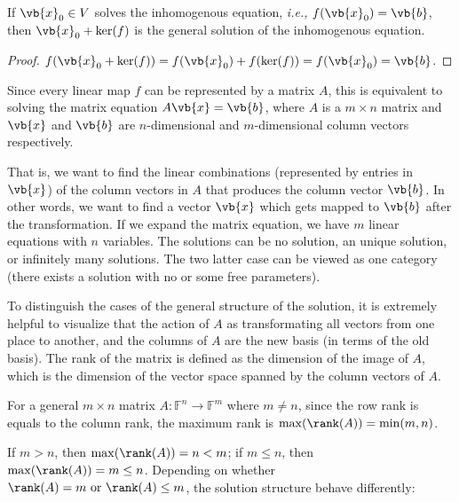 \documentclass[a4paper,12pt]{report}
\begin{document}
\begin{lemma} \label{homoinhomo} 
If \(\vb{x} _{0} \in V\) solves the inhomogenous equation, \textit{i.e.,} \(f(\vb{x} _{0} ) = \vb{b}\), then \(\vb{x} _{0} + \ker (f) \) is the general solution of the inhomogenous equation.   
\end{lemma}

\begin{proof}  
    \(f(\vb{x} _{0} + \ker (f)) = f(\vb{x} _{0} ) + f(\ker (f)) = f(\vb{x} _{0} ) = \vb{b} \). 
\end{proof}

Since every linear map \(f\) can be represented by a matrix \(A\), this is equivalent to solving the matrix equation \(A\vb{x} = \vb{b} \), where \(A\) is a \(m \times n\) matrix and \(\vb{x} \) and \(\vb{b} \) are \(n\)-dimensional and \(m\)-dimensional column vectors respectively. 

That is, we want to find the linear combinations (represented by entries in \(\vb{x} \)) of the column vectors in \(A\) that produces the column vector \(\vb{b} \). In other words, we want to find a vector \(\vb{x} \) which gets mapped to \(\vb{b} \) after the transformation. If we expand the matrix equation, we have \(m\) linear equations with \(n\) variables. The solutions can be no solution, an unique solution, or infinitely many solutions. The two latter case can be viewed as one category (there exists a solution with no or some free parameters).

To distinguish the cases of the general structure of the solution, it is extremely helpful to visualize that the action of \(A\) as transformating all vectors from one place to another, and the columns of \(A\) are the new basis (in terms of the old basis). The rank of the matrix is defined as the dimension of the image of \(A\), which is the dimension of the vector space spanned by the column vectors of \(A\). 

For a general \(m \times n\) matrix \(A:\mathbb{F}^{n}\to \mathbb{F}^{m}  \) where \(m \neq n\), since the row rank is equals to the column rank, the maximum rank is \(\max (\rank (A)) = \min (m,n)\). 

If \(m > n\), then \(\max (\rank (A)) = n < m\); if \(m \le n\), then \(\max (\rank (A)) = m \le n\). Depending on whether \(\rank (A) = m \text { or } \rank (A) \le m\), the solution structure behave differently:  
\end{document}
